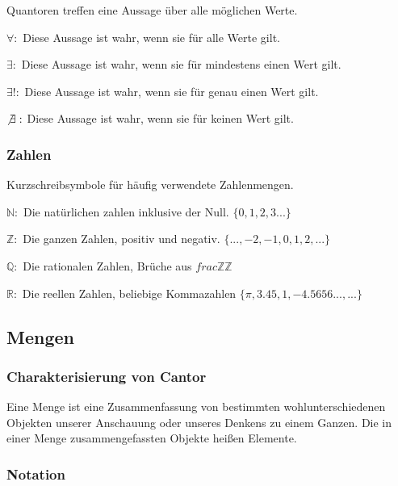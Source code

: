 \documentclass[pdftex,12pt,a4paper,fleqn]{scrartcl}
\begin{document}
Quantoren treffen eine Aussage über alle möglichen Werte.

$\forall:$ Diese Aussage ist wahr, wenn sie für alle Werte gilt.

$\exists:$ Diese Aussage ist wahr, wenn sie für mindestens einen Wert gilt.

$\exists!:$ Diese Aussage ist wahr, wenn sie für genau einen Wert gilt.

$\not\exists:$ Diese Aussage ist wahr, wenn sie für keinen Wert gilt.


\subsubsection{Zahlen} %
\label{ssub:zahlen}

Kurzschreibsymbole für häufig verwendete Zahlenmengen.

$\mathbb{N}:$ Die natürlichen zahlen inklusive der Null. $\{0,1,2,3...\}$

$\mathbb{Z}:$ Die ganzen Zahlen, positiv und negativ. $\{...,-2,-1,0,1,2,...\}$

$\mathbb{Q}:$ Die rationalen Zahlen, Brüche aus $frac{\mathbb{Z}}{\mathbb{Z}}$

$\mathbb{R}:$ Die reellen Zahlen, beliebige Kommazahlen $\{\pi,3.45,1,-4.5656...,...\}$



\subsection{Mengen} %
\label{sub:mengen}

\subsubsection{Charakterisierung von Cantor} %
\label{ssub:charakterisierung_von_cantor}

Eine Menge ist eine Zusammenfassung von bestimmten wohlunterschiedenen Objekten unserer Anschauung oder unseres Denkens zu einem Ganzen. Die in einer Menge zusammengefassten Objekte heißen Elemente.


\subsubsection{Notation} %
\label{ssub:notation}
\end{document}
